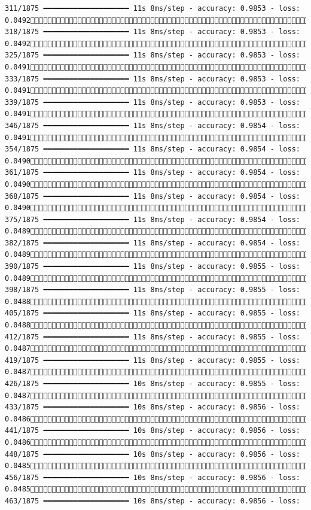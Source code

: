 \documentclass[
  letterpaper,
  DIV=11,
  numbers=noendperiod]{scrreprt}
\begin{document}
\begin{verbatim}
311/1875 ━━━━━━━━━━━━━━━━━━━━ 11s 8ms/step - accuracy: 0.9853 - loss: 0.0492 318/1875 ━━━━━━━━━━━━━━━━━━━━ 11s 8ms/step - accuracy: 0.9853 - loss: 0.0492 325/1875 ━━━━━━━━━━━━━━━━━━━━ 11s 8ms/step - accuracy: 0.9853 - loss: 0.0491 333/1875 ━━━━━━━━━━━━━━━━━━━━ 11s 8ms/step - accuracy: 0.9853 - loss: 0.0491 339/1875 ━━━━━━━━━━━━━━━━━━━━ 11s 8ms/step - accuracy: 0.9853 - loss: 0.0491 346/1875 ━━━━━━━━━━━━━━━━━━━━ 11s 8ms/step - accuracy: 0.9854 - loss: 0.0491 354/1875 ━━━━━━━━━━━━━━━━━━━━ 11s 8ms/step - accuracy: 0.9854 - loss: 0.0490 361/1875 ━━━━━━━━━━━━━━━━━━━━ 11s 8ms/step - accuracy: 0.9854 - loss: 0.0490 368/1875 ━━━━━━━━━━━━━━━━━━━━ 11s 8ms/step - accuracy: 0.9854 - loss: 0.0490 375/1875 ━━━━━━━━━━━━━━━━━━━━ 11s 8ms/step - accuracy: 0.9854 - loss: 0.0489 382/1875 ━━━━━━━━━━━━━━━━━━━━ 11s 8ms/step - accuracy: 0.9854 - loss: 0.0489 390/1875 ━━━━━━━━━━━━━━━━━━━━ 11s 8ms/step - accuracy: 0.9855 - loss: 0.0489 398/1875 ━━━━━━━━━━━━━━━━━━━━ 11s 8ms/step - accuracy: 0.9855 - loss: 0.0488 405/1875 ━━━━━━━━━━━━━━━━━━━━ 11s 8ms/step - accuracy: 0.9855 - loss: 0.0488 412/1875 ━━━━━━━━━━━━━━━━━━━━ 11s 8ms/step - accuracy: 0.9855 - loss: 0.0487 419/1875 ━━━━━━━━━━━━━━━━━━━━ 11s 8ms/step - accuracy: 0.9855 - loss: 0.0487 426/1875 ━━━━━━━━━━━━━━━━━━━━ 10s 8ms/step - accuracy: 0.9855 - loss: 0.0487 433/1875 ━━━━━━━━━━━━━━━━━━━━ 10s 8ms/step - accuracy: 0.9856 - loss: 0.0486 441/1875 ━━━━━━━━━━━━━━━━━━━━ 10s 8ms/step - accuracy: 0.9856 - loss: 0.0486 448/1875 ━━━━━━━━━━━━━━━━━━━━ 10s 8ms/step - accuracy: 0.9856 - loss: 0.0485 456/1875 ━━━━━━━━━━━━━━━━━━━━ 10s 8ms/step - accuracy: 0.9856 - loss: 0.0485 463/1875 ━━━━━━━━━━━━━━━━━━━━ 10s 8ms/step - accuracy: 0.9856 - loss: 
\end{verbatim}
\end{document}
